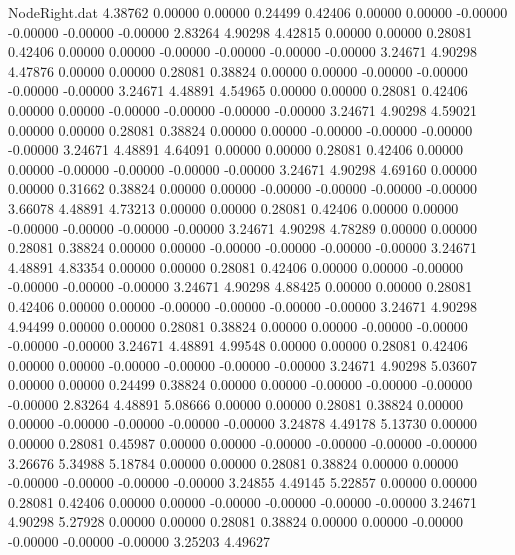 \begin{filecontents}{NodeRight.dat}
   4.38762    0.00000    0.00000     0.24499    0.42406    0.00000    0.00000   -0.00000   -0.00000   -0.00000   -0.00000    2.83264    4.90298
   4.42815    0.00000    0.00000     0.28081    0.42406    0.00000    0.00000   -0.00000   -0.00000   -0.00000   -0.00000    3.24671    4.90298
   4.47876    0.00000    0.00000     0.28081    0.38824    0.00000    0.00000   -0.00000   -0.00000   -0.00000   -0.00000    3.24671    4.48891
   4.54965    0.00000    0.00000     0.28081    0.42406    0.00000    0.00000   -0.00000   -0.00000   -0.00000   -0.00000    3.24671    4.90298
   4.59021    0.00000    0.00000     0.28081    0.38824    0.00000    0.00000   -0.00000   -0.00000   -0.00000   -0.00000    3.24671    4.48891
   4.64091    0.00000    0.00000     0.28081    0.42406    0.00000    0.00000   -0.00000   -0.00000   -0.00000   -0.00000    3.24671    4.90298
   4.69160    0.00000    0.00000     0.31662    0.38824    0.00000    0.00000   -0.00000   -0.00000   -0.00000   -0.00000    3.66078    4.48891
   4.73213    0.00000    0.00000     0.28081    0.42406    0.00000    0.00000   -0.00000   -0.00000   -0.00000   -0.00000    3.24671    4.90298
   4.78289    0.00000    0.00000     0.28081    0.38824    0.00000    0.00000   -0.00000   -0.00000   -0.00000   -0.00000    3.24671    4.48891
   4.83354    0.00000    0.00000     0.28081    0.42406    0.00000    0.00000   -0.00000   -0.00000   -0.00000   -0.00000    3.24671    4.90298
   4.88425    0.00000    0.00000     0.28081    0.42406    0.00000    0.00000   -0.00000   -0.00000   -0.00000   -0.00000    3.24671    4.90298
   4.94499    0.00000    0.00000     0.28081    0.38824    0.00000    0.00000   -0.00000   -0.00000   -0.00000   -0.00000    3.24671    4.48891
   4.99548    0.00000    0.00000     0.28081    0.42406    0.00000    0.00000   -0.00000   -0.00000   -0.00000   -0.00000    3.24671    4.90298
   5.03607    0.00000    0.00000     0.24499    0.38824    0.00000    0.00000   -0.00000   -0.00000   -0.00000   -0.00000    2.83264    4.48891
   5.08666    0.00000    0.00000     0.28081    0.38824    0.00000    0.00000   -0.00000   -0.00000   -0.00000   -0.00000    3.24878    4.49178
   5.13730    0.00000    0.00000     0.28081    0.45987    0.00000    0.00000   -0.00000   -0.00000   -0.00000   -0.00000    3.26676    5.34988
   5.18784    0.00000    0.00000     0.28081    0.38824    0.00000    0.00000   -0.00000   -0.00000   -0.00000   -0.00000    3.24855    4.49145
   5.22857    0.00000    0.00000     0.28081    0.42406    0.00000    0.00000   -0.00000   -0.00000   -0.00000   -0.00000    3.24671    4.90298
   5.27928    0.00000    0.00000     0.28081    0.38824    0.00000    0.00000   -0.00000   -0.00000   -0.00000   -0.00000    3.25203    4.49627

\end{filecontents}
